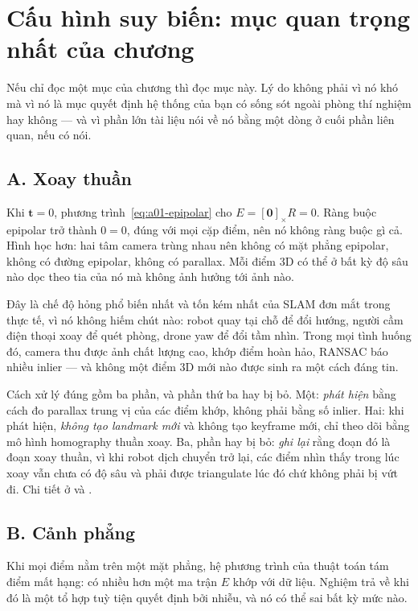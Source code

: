\documentclass[../../vslam.tex]{subfiles}
\begin{document}
\section{Cấu hình suy biến: mục quan trọng nhất của chương}

Nếu chỉ đọc một mục của chương thì đọc mục này. Lý do không phải vì nó khó mà vì nó là mục quyết định hệ thống của bạn có sống sót ngoài phòng thí nghiệm hay không --- và vì phần lớn tài liệu nói về nó bằng một dòng ở cuối phần liên quan, nếu có nói.

\subsection{A. Xoay thuần}

Khi \(\mathbf{t} = 0\), phương trình~\eqref{eq:a01-epipolar} cho \(E = [\mathbf{0}]_\times R = 0\). Ràng buộc epipolar trở thành \(0 = 0\), đúng với mọi cặp điểm, nên nó không ràng buộc gì cả. Hình học hơn: hai tâm camera trùng nhau nên không có mặt phẳng epipolar, không có đường epipolar, không có parallax. Mỗi điểm \(3\)D có thể ở bất kỳ độ sâu nào dọc theo tia của nó mà không ảnh hưởng tới ảnh nào.

Đây là chế độ hỏng phổ biến nhất và tốn kém nhất của SLAM đơn mắt trong thực tế, vì nó không hiếm chút nào: robot quay tại chỗ để đổi hướng, người cầm điện thoại xoay để quét phòng, drone yaw để đổi tầm nhìn. Trong mọi tình huống đó, camera thu được ảnh chất lượng cao, khớp điểm hoàn hảo, RANSAC báo nhiều inlier --- và không một điểm \(3\)D mới nào được sinh ra một cách đáng tin.

Cách xử lý đúng gồm ba phần, và phần thứ ba hay bị bỏ. Một: \emph{phát hiện} bằng cách đo parallax trung vị của các điểm khớp, không phải bằng số inlier. Hai: khi phát hiện, \emph{không tạo landmark mới} và không tạo keyframe mới, chỉ theo dõi bằng mô hình homography thuần xoay. Ba, phần hay bị bỏ: \emph{ghi lại} rằng đoạn đó là đoạn xoay thuần, vì khi robot dịch chuyển trở lại, các điểm nhìn thấy trong lúc xoay vẫn chưa có độ sâu và phải được triangulate lúc đó chứ không phải bị vứt đi. Chi tiết ở  và .

\subsection{B. Cảnh phẳng}

Khi mọi điểm nằm trên một mặt phẳng, hệ phương trình của thuật toán tám điểm mất hạng: có nhiều hơn một ma trận \(E\) khớp với dữ liệu. Nghiệm trả về khi đó là một tổ hợp tuỳ tiện quyết định bởi nhiễu, và nó có thể sai bất kỳ mức nào.
\end{document}

